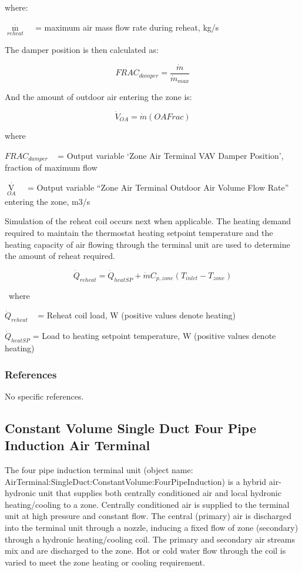 where:

\({\mathop m\limits^\cdot_{reheat}}\) ~ = maximum air mass flow rate during reheat, kg/s

The damper position is then calculated as:

\begin{equation}
FRAC_{damper} = \frac{\dot m}{\dot m_{max}}
\end{equation}

And the amount of outdoor air entering the zone is:

\begin{equation}
\dot V_{OA} = \dot m (OAFrac)
\end{equation}

where

\(FRAC_{damper}\) ~ = Output variable `Zone Air Terminal VAV Damper Position', fraction of maximum flow

\({\mathop V\limits^\cdot_{OA}}\) ~ = Output variable ``Zone Air Terminal Outdoor Air Volume Flow Rate'' entering the zone, m3/s

Simulation of the reheat coil occurs next when applicable. The heating demand required to maintain the thermostat heating setpoint temperature and the heating capacity of air flowing through the terminal unit are used to determine the amount of reheat required.

\begin{equation}
{\dot Q_{reheat}} = {\dot Q_{heatSP}} + \dot m C_{p,zone}(T_{inlet}-T_{zone})
\end{equation}

~where

\({\dot Q_{reheat}}\) ~ = Reheat coil load, W (positive values denote heating)

\({\dot Q_{heatSP}}\) = Load to heating setpoint temperature, W (positive values denote heating)

\subsubsection{References}\label{references-001}

No specific references.

\subsection{Constant Volume Single Duct Four Pipe Induction Air Terminal}\label{constant-volume-single-duct-four-pipe-induction-air-terminal}

The four pipe induction terminal unit (object name: \\ AirTerminal:SingleDuct:ConstantVolume:FourPipeInduction) is a hybrid air-hydronic unit that supplies both centrally conditioned air and local hydronic heating/cooling to a zone. Centrally conditioned air is supplied to the terminal unit at high pressure and constant flow. The central (primary) air is discharged into the terminal unit through a nozzle, inducing a fixed flow of zone (secondary) through a hydronic heating/cooling coil. The primary and secondary air streams mix and are discharged to the zone. Hot or cold water flow through the coil is varied to meet the zone heating or cooling requirement.

